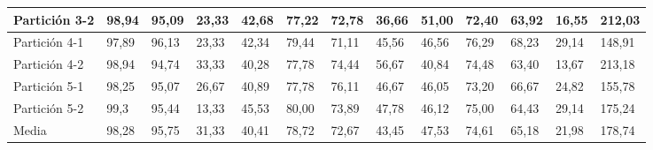 \documentclass[10pt,a4paper]{article}
\begin{document}
\begin{table}[H]
{\begin{tabular}{l|l|l|l|l|l|l|l|l|l|l|l|l|}
\multicolumn{1}{|l|}{Partición 3-2} & 98,94        & 95,09         & 23,33   & 42,68 & 77,22        & 72,78         & 36,66   & 51,00 & 72,40        & 63,92         & 16,55   & 212,03 \\ \hline
\multicolumn{1}{|l|}{Partición 4-1} & 97,89        & 96,13         & 23,33   & 42,34 & 79,44        & 71,11         & 45,56   & 46,56 & 76,29        & 68,23         & 29,14   & 148,91 \\ \hline
\multicolumn{1}{|l|}{Partición 4-2} & 98,94        & 94,74         & 33,33   & 40,28 & 77,78        & 74,44         & 56,67   & 40,84 & 74,48        & 63,40         & 13,67   & 213,18 \\ \hline
\multicolumn{1}{|l|}{Partición 5-1} & 98,25        & 95,07         & 26,67   & 40,89 & 77,78        & 76,11         & 46,67   & 46,05 & 73,20        & 66,67         & 24,82   & 155,78 \\ \hline
\multicolumn{1}{|l|}{Partición 5-2} & 99,3         & 95,44         & 13,33   & 45,53 & 80,00        & 73,89         & 47,78   & 46,12 & 75,00        & 64,43         & 29,14   & 175,24 \\ \hline
\multicolumn{1}{|l|}{Media}         & 98,28        & 95,75         & 31,33   & 40,41 & 78,72        & 72,67         & 43,45   & 47,53 & 74,61        & 65,18         & 21,98   & 178,74 \\ \hline
\end{tabular}}
\end{table}
\end{document}
